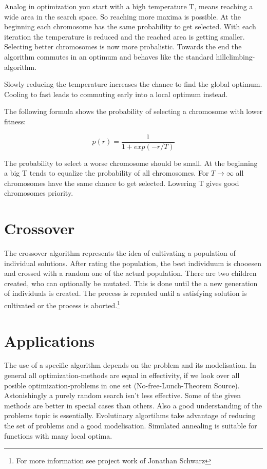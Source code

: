 \documentclass[10pt,a4paper,DIV=11]{scrreprt}
\begin{document}
Analog in optimization you start with a high temperature T, means reaching a wide area in the search space. So reaching more maxima is possible. At the beginning each chromosome has the same probability to get selected. With each iteration the temperature is reduced and the reached area is getting smaller. Selecting better chromosomes is now more probalistic.
Towards the end the algorithm commutes in an optimum and behaves like the standard hillclimbing-algorithm.

Slowly reducing the temperature increases the chance to find the global optimum. Cooling to fast leads to commuting early into a local optimum instead.

The following formula shows the probability of selecting a chromosome with lower fitness:

\begin{equation}
p(r) = \frac{1}{1+exp(-r/T)}
\end{equation} 

The probability to select a worse chromosome should be small.
At the beginning a big T tends to equalize the probability of all chromosomes. For $T \to \infty$ all chromosomes have the same chance to get selected. Lowering T gives good chromosomes priority.


\section{Crossover}
The crossover algorithm represents the idea of cultivating a population of individual solutions. After rating the population, the best individuum is chooesen and crossed with a random one of the actual population. There are two children created, who can optionally be mutated. This is done until the a new generation of individuals is created.
The process is repeated until a satisfying solution is cultivated or the process is aborted.\footnote{For more information see project work of Jonathan Schwarz}

\section{Applications}
The use of a specific algorithm depends on the problem and its modelisation. In general all optimization-methods are equal in effectivity, if we look over all posible optimization-problems in one set (No-free-Lunch-Theorem Source). Astonishingly a purely random search isn't less effective.
Some of the given methods are better in special cases than others. Also a good understanding of the problems topic is essentially. Evolutinary algortihms take advantage of reducing the set of problems and a good modelisation.
Simulated annealing is suitable for functions with many local optima.
\end{document}
